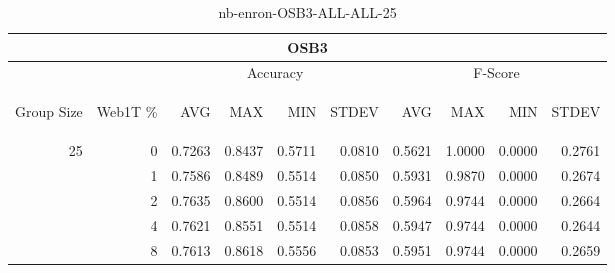\begin{center}
\begin{table}[htbp]
\begin{tabular}{ | r | r | r | r | r | r | r | r | r | r |}
\hline
\multicolumn{10}{|c|}{OSB3}\\
\hline
 & & \multicolumn{4}{|c|}{Accuracy} & \multicolumn{4}{|c|}{F-Score}\\ \cline{3-10}
\begin{sideways}Group Size\end{sideways} & \begin{sideways}Web1T \%\end{sideways} & \begin{sideways}AVG\end{sideways} & \begin{sideways}MAX\end{sideways} & \begin{sideways}MIN\end{sideways} & \begin{sideways}STDEV\end{sideways} & \begin{sideways}AVG\end{sideways} & \begin{sideways}MAX\end{sideways} & \begin{sideways}MIN\end{sideways} & \begin{sideways}STDEV\end{sideways}\\
\hline
\multirow{4}{*}{25}
 & 0 & 0.7263 & 0.8437 & 0.5711 & 0.0810 & 0.5621 & 1.0000 & 0.0000 & 0.2761\\ \cline{2-10}
 & 1 & 0.7586 & 0.8489 & 0.5514 & 0.0850 & 0.5931 & 0.9870 & 0.0000 & 0.2674\\ \cline{2-10}
 & 2 & 0.7635 & 0.8600 & 0.5514 & 0.0856 & 0.5964 & 0.9744 & 0.0000 & 0.2664\\ \cline{2-10}
 & 4 & 0.7621 & 0.8551 & 0.5514 & 0.0858 & 0.5947 & 0.9744 & 0.0000 & 0.2644\\ \cline{2-10}
 & 8 & 0.7613 & 0.8618 & 0.5556 & 0.0853 & 0.5951 & 0.9744 & 0.0000 & 0.2659\\ \cline{2-10}
\hline
\end{tabular}
\caption{nb-enron-OSB3-ALL-ALL-25}
\label{table:nb-enron-OSB3-ALL-ALL-25}
\end{table}
\end{center}

